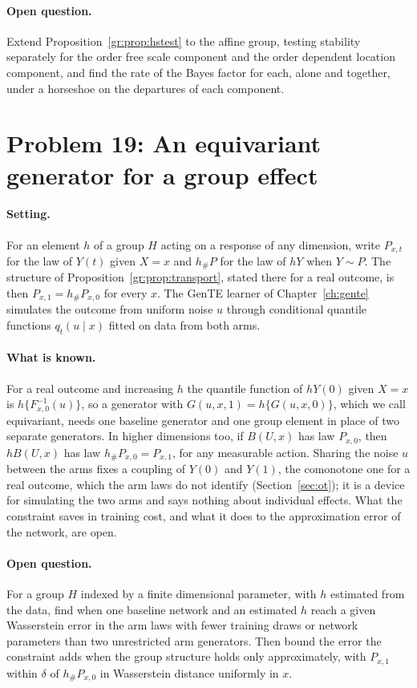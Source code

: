 \paragraph{Open question.} Extend Proposition~\ref{gr:prop:hstest} to the affine group, testing stability separately for the order free scale component and the order dependent location component, and find the rate of the Bayes factor for each, alone and together, under a horseshoe on the departures of each component.

\section{Problem 19: An equivariant generator for a group effect}

\paragraph{Setting.} For an element $h$ of a group $H$ acting on a response of any dimension, write $P_{x,t}$ for the law of $Y(t)$ given $X=x$ and $h_\#P$ for the law of $hY$ when $Y\sim P$. The structure of Proposition~\ref{gr:prop:transport}, stated there for a real outcome, is then $P_{x,1}=h_\#P_{x,0}$ for every $x$. The GenTE learner of Chapter~\ref{ch:gente} simulates the outcome from uniform noise $u$ through conditional quantile functions $q_t(u\mid x)$ fitted on data from both arms.

\paragraph{What is known.} For a real outcome and increasing $h$ the quantile function of $hY(0)$ given $X=x$ is $h\{F^{-1}_{x,0}(u)\}$, so a generator with $G(u,x,1)=h\{G(u,x,0)\}$, which we call equivariant, needs one baseline generator and one group element in place of two separate generators. In higher dimensions too, if $B(U,x)$ has law $P_{x,0}$, then $hB(U,x)$ has law $h_\#P_{x,0}=P_{x,1}$, for any measurable action. Sharing the noise $u$ between the arms fixes a coupling of $Y(0)$ and $Y(1)$, the comonotone one for a real outcome, which the arm laws do not identify (Section~\ref{sec:ot}); it is a device for simulating the two arms and says nothing about individual effects. What the constraint saves in training cost, and what it does to the approximation error of the network, are open.

\paragraph{Open question.} For a group $H$ indexed by a finite dimensional parameter, with $h$ estimated from the data, find when one baseline network and an estimated $h$ reach a given Wasserstein error in the arm laws with fewer training draws or network parameters than two unrestricted arm generators. Then bound the error the constraint adds when the group structure holds only approximately, with $P_{x,1}$ within $\delta$ of $h_\#P_{x,0}$ in Wasserstein distance uniformly in $x$.

